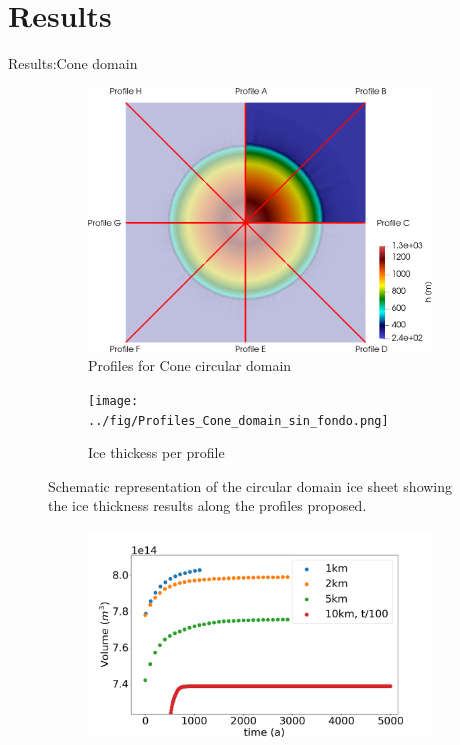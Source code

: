 \documentclass[11pt]{beamer}
\begin{document}
	\section{Results}
		\begin{frame}[allowframebreaks]{Results:Cone domain}
		\justifying
		\begin{figure}
			\centering
			\begin{subfigure}{.5\textwidth}
				\centering
				\includegraphics[width=0.99\linewidth]{../fig/Profiles_Cone_combined_domains.png}
				\caption{Profiles for Cone circular domain}
				\label{Schematic_Cone}
			\end{subfigure}%
			\begin{subfigure}{.5\textwidth}
				\centering
				\texttt{[image: ../fig/Profiles\_Cone\_domain\_sin\_fondo.png]}
				\caption{Ice thickess per profile}
				\label{Profiles_cone}
			\end{subfigure}
			\caption{Schematic representation of the circular domain ice sheet showing the ice thickness results along the profiles proposed.}
			\label{Cone_scheme}
		\end{figure}
		\begin{figure}
			\centering
			\begin{subfigure}{.5\textwidth}
				\centering
				\includegraphics[width=1.1\linewidth]{../fig/Volume_CONE_full_all_res_vs_time.png}

\end{subfigure}
\end{figure}
\end{frame}
\end{document}
